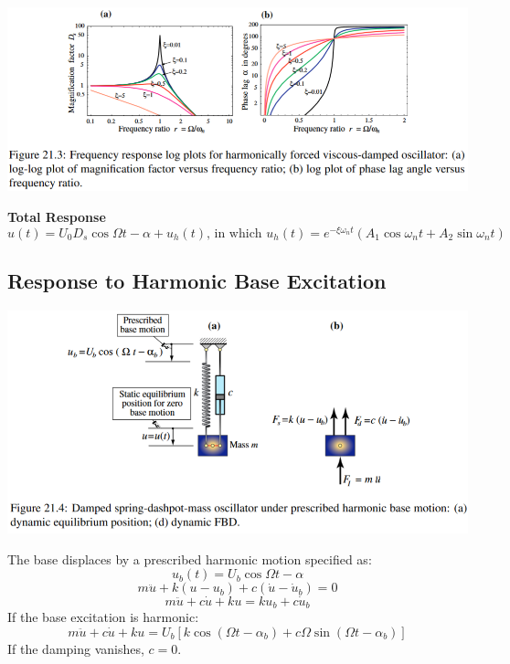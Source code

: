 \documentclass{article}
\begin{document}
\begin{multicols*}{2}
    \includegraphics[width=\linewidth]{Figures/freq_response_harmonic_osc.png}

    \textbf{Total Response}
    $$\boxed{u(t)=U_0D_s\cos{\Omega t-\alpha}+u_h(t) \text{, in which } u_h(t) = e^{-\xi \omega_n t}\left(A_1\cos{\omega_nt}+A_2\sin{\omega_nt}\right)}$$

    \subsection*{Response to Harmonic Base Excitation}
    \includegraphics[width=\linewidth]{Figures/harmonic_base.png}\par 
    The base displaces by a prescribed harmonic motion specified as:
    $$u_b(t) = U_b\cos{\Omega t-\alpha}$$
    $$m\ddot{u}+k(u-u_b)+c(\dot{u}-\dot{u}_b)=0$$
    $$\boxed{m\ddot{u}+c\dot{u}+ku=ku_b+c\dot{u}_b}$$
    If the base excitation is harmonic:
    $$\boxed{m\ddot{u}+c\dot{u}+ku=U_b\left[k\cos{(\Omega t-\alpha_b)}+c\Omega\sin{(\Omega t-\alpha_b)}\right]}$$
    If the damping vanishes, $c=0$.


\end{multicols*}
\end{document}
